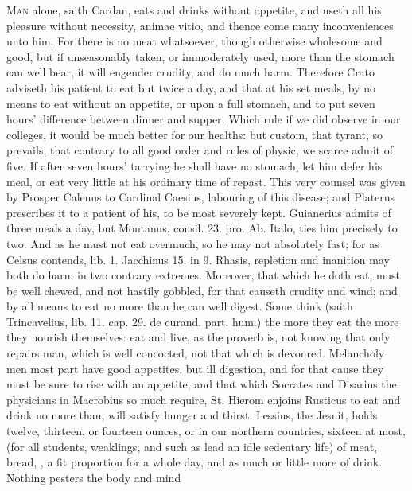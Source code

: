 {\lettrine{M}{an} alone, saith Cardan, eats and drinks without appetite, and
useth all his pleasure without necessity, animae vitio, and thence come
many inconveniences unto him. For there is no meat whatsoever, though
otherwise wholesome and good, but if unseasonably taken, or
immoderately used, more than the stomach can well bear, it will
engender crudity, and do much harm. Therefore Crato adviseth his
patient to eat but twice a day, and that at his set meals, by no means
to eat without an appetite, or upon a full stomach, and to put seven
hours' difference between dinner and supper. Which rule if we did
observe in our colleges, it would be much better for our healths: but
custom, that tyrant, so prevails, that contrary to all good order and
rules of physic, we scarce admit of five. If after seven hours'
tarrying he shall have no stomach, let him defer his meal, or eat very
little at his ordinary time of repast. This very counsel was given by
Prosper Calenus to Cardinal Caesius, labouring of this disease; and
 Platerus prescribes it to a patient of his, to be most severely
kept. Guianerius admits of three meals a day, but Montanus, consil. 23.
pro. Ab. Italo, ties him precisely to two. And as he must not eat
overmuch, so he may not absolutely fast; for as Celsus contends, lib.
1. Jacchinus 15. in 9. Rhasis, repletion and inanition may both
do harm in two contrary extremes. Moreover, that which he doth eat,
must be well chewed, and not hastily gobbled, for that causeth
crudity and wind; and by all means to eat no more than he can well
digest. Some think (saith  Trincavelius, lib. 11. cap. 29. de
curand. part. hum.) the more they eat the more they nourish themselves:
eat and live, as the proverb is, not knowing that only repairs man,
which is well concocted, not that which is devoured. Melancholy men
most part have good appetites, but ill digestion, and for that
cause they must be sure to rise with an appetite; and that which
Socrates and Disarius the physicians in Macrobius so much
require, St. Hierom enjoins Rusticus to eat and drink no more than,
will satisfy hunger and thirst. Lessius, the Jesuit, holds
twelve, thirteen, or fourteen ounces, or in our northern countries,
sixteen at most, (for all students, weaklings, and such as lead an idle
sedentary life) of meat, bread, \etc{}, a fit proportion for a whole day,
and as much or little more of drink. Nothing pesters the body and mind
}
